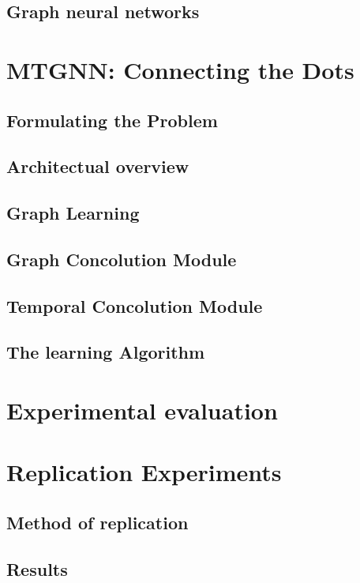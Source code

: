 \documentclass[letterpaper,twocolumn,11pt]{article}
\begin{document}
\subsection{Graph neural networks}

\section{MTGNN: Connecting the Dots}

\subsection{Formulating the Problem}
\subsection{Architectual overview}
\subsection{Graph Learning}
\subsection{Graph Concolution Module}
\subsection{Temporal Concolution Module}
\subsection{The learning Algorithm}

\section{Experimental evaluation}

\section{Replication Experiments}

\subsection{Method of replication}

\subsection{Results}
\end{document}
